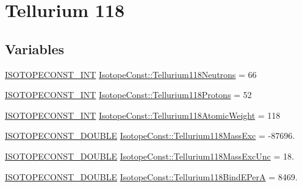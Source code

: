\hypertarget{group___isotope_const-_tellurium-_te118}{}\section{Tellurium 118}
\label{group___isotope_const-_tellurium-_te118}
\subsection*{Variables}
\begin{DoxyCompactItemize}
\item 
\mbox{\hyperlink{group___isotope_const-_macros_ga5f18360b3e99483a35c32d789e62621c}{I\+S\+O\+T\+O\+P\+E\+C\+O\+N\+S\+T\+\_\+\+I\+NT}} \mbox{\hyperlink{group___isotope_const-_tellurium-_te118_ga904a1c768ec7ca4c111a96198513a9c6}{Isotope\+Const\+::\+Tellurium118\+Neutrons}} = 66
\item 
\mbox{\hyperlink{group___isotope_const-_macros_ga5f18360b3e99483a35c32d789e62621c}{I\+S\+O\+T\+O\+P\+E\+C\+O\+N\+S\+T\+\_\+\+I\+NT}} \mbox{\hyperlink{group___isotope_const-_tellurium-_te118_ga54a366fb9f6e635a0b68ec43fddccd96}{Isotope\+Const\+::\+Tellurium118\+Protons}} = 52
\item 
\mbox{\hyperlink{group___isotope_const-_macros_ga5f18360b3e99483a35c32d789e62621c}{I\+S\+O\+T\+O\+P\+E\+C\+O\+N\+S\+T\+\_\+\+I\+NT}} \mbox{\hyperlink{group___isotope_const-_tellurium-_te118_ga02768d17be6007c0d551263890e37a3d}{Isotope\+Const\+::\+Tellurium118\+Atomic\+Weight}} = 118
\item 
\mbox{\hyperlink{group___isotope_const-_macros_ga8f45a7272ce02c0b4c65c44636ed719a}{I\+S\+O\+T\+O\+P\+E\+C\+O\+N\+S\+T\+\_\+\+D\+O\+U\+B\+LE}} \mbox{\hyperlink{group___isotope_const-_tellurium-_te118_gae98be884b7b64e0adf6f7be1048c6916}{Isotope\+Const\+::\+Tellurium118\+Mass\+Exc}} = -\/87696.
\item 
\mbox{\hyperlink{group___isotope_const-_macros_ga8f45a7272ce02c0b4c65c44636ed719a}{I\+S\+O\+T\+O\+P\+E\+C\+O\+N\+S\+T\+\_\+\+D\+O\+U\+B\+LE}} \mbox{\hyperlink{group___isotope_const-_tellurium-_te118_ga4b823500be9c2b48e3f378dcfaf7af37}{Isotope\+Const\+::\+Tellurium118\+Mass\+Exc\+Unc}} = 18.
\item 
\mbox{\hyperlink{group___isotope_const-_macros_ga8f45a7272ce02c0b4c65c44636ed719a}{I\+S\+O\+T\+O\+P\+E\+C\+O\+N\+S\+T\+\_\+\+D\+O\+U\+B\+LE}} \mbox{\hyperlink{group___isotope_const-_tellurium-_te118_ga0c34e9c07bec078537fe322f9b87884f}{Isotope\+Const\+::\+Tellurium118\+Bind\+E\+PerA}} = 8469.
\item 

\end{DoxyCompactItemize}
